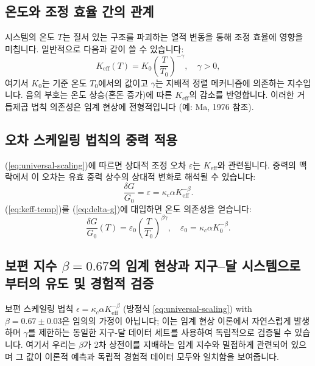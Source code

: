 \documentclass[11pt,a4paper]{article}
\newcommand{\Keff}{K_{\mathrm{eff}}}
\newcommand{\eps}{\varepsilon}
\newcommand{\kappac}{\kappa_c}
\begin{document}
	\subsection{온도와 조정 효율 간의 관계}
	\label{subsec:temp-keff}
	
	시스템의 온도 $T$는 질서 있는 구조를 파괴하는 열적 변동을 통해 조정 효율에 영향을 미칩니다. 일반적으로 다음과 같이 쓸 수 있습니다:
	\begin{equation}
		\Keff(T) = K_0 \left( \frac{T}{T_0} \right)^{-\gamma}, \quad \gamma > 0,
		\label{eq:keff-temp}
	\end{equation}
	여기서 $K_0$는 기준 온도 $T_0$에서의 값이고 $\gamma$는 지배적 정렬 메커니즘에 의존하는 지수입니다. 음의 부호는 온도 상승(혼돈 증가)에 따른 $\Keff$의 감소를 반영합니다. 이러한 거듭제곱 법칙 의존성은 임계 현상에 전형적입니다 (예: Ma, 1976 참조).
	
	\subsection{오차 스케일링 법칙의 중력 적용}
	\label{subsec:error-gravity}
	
	(\ref{eq:universal-scaling})에 따르면 상대적 조정 오차 $\eps$는 $\Keff$와 관련됩니다. 중력의 맥락에서 이 오차는 유효 중력 상수의 상대적 변화로 해석될 수 있습니다:
	\begin{equation}
		\frac{\delta G}{G_0} = \eps = \kappac \alpha \Keff^{-\beta}.
		\label{eq:delta-g}
	\end{equation}
	(\ref{eq:keff-temp})를 (\ref{eq:delta-g})에 대입하면 온도 의존성을 얻습니다:
	\begin{equation}
		\frac{\delta G}{G_0}(T) = \eps_0 \left( \frac{T}{T_0} \right)^{\beta\gamma}, \quad \eps_0 = \kappac \alpha K_0^{-\beta}.
		\label{eq:g-temp}
	\end{equation}
	
	\subsection{보편 지수 \(\beta = 0.67\)의 임계 현상과 지구–달 시스템으로부터의 유도 및 경험적 검증}
	\label{subsec:beta-empirical}
	
	보편 스케일링 법칙 $\epsilon = \kappa_c \alpha K_{\mathrm{eff}}^{-\beta}$ (방정식 \ref{eq:universal-scaling}) with $\beta = 0.67 \pm 0.03$은 임의의 가정이 아닙니다; 이는 임계 현상 이론에서 자연스럽게 발생하며 $\gamma$를 제한하는 동일한 지구-달 데이터 세트를 사용하여 독립적으로 검증될 수 있습니다. 여기서 우리는 $\beta$가 2차 상전이를 지배하는 임계 지수와 밀접하게 관련되어 있으며 그 값이 이론적 예측과 독립적 경험적 데이터 모두와 일치함을 보여줍니다.
	
\end{document}
